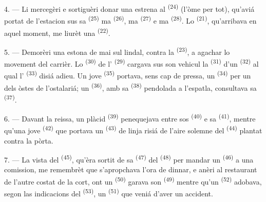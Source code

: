 4. --- Li mercegèri e sortiguèri donar una estrena al 
\textsuperscript{(24)} (l'òme per tot), qu'aviá portat de l'estacion sus sa
 \textsuperscript{(25)} ma 
\textsuperscript{(26)}, ma  \textsuperscript{(27)} e ma
 \textsuperscript{(28)}. Lo 
\textsuperscript{(21)}, qu'arribava en aquel moment, me liurèt una 
\textsuperscript{(22)}.

5. --- Demorèri una estona de mai sul lindal, contra la  \textsuperscript{(23)}, a agachar lo movement del carrièr. Lo
 \textsuperscript{(30)} de l'
\textsuperscript{(29)} cargava sus son vehicul la 
\textsuperscript{(31)} d'un  \textsuperscript{(32)} al qual
l' \textsuperscript{(33)} disiá adieu. Un jove
 \textsuperscript{(35)} portava, sens cap de pressa, un
 \textsuperscript{(34)} per un dels òstes de l'ostalariá; un
 \textsuperscript{(36)}, amb sa 
\textsuperscript{(38)} pendolada a l'espatla, consultava sa 
\textsuperscript{(37)}.

\VUsaut{4.0mm}
\VUsaut{3.0mm}

6. --- Davant la reissa, un plàcid  \textsuperscript{(39)}
penequejava entre sos  \textsuperscript{(40)} e sa
 \textsuperscript{(41)}, mentre qu'una jove
 \textsuperscript{(42)} que portava un 
\textsuperscript{(43)} de linja risiá de l'aire solemne del  \textsuperscript{(44)} plantat contra la pòrta.

7. --- La vista del  \textsuperscript{(45)}, qu'èra sortit de sa
 \textsuperscript{(47)} del 
\textsuperscript{(48)} per mandar un  \textsuperscript{(46)} a
una comission, me remembrèt que s'apropchava l'ora de dinnar, e anèri al restaurant
de l'autre costat de la cort, ont un 
\textsuperscript{(50)} garava son  \textsuperscript{(49)}
mentre qu'un  \textsuperscript{(52)} adobava, segon las
indicacions del  \textsuperscript{(53)}, un  \textsuperscript{(51)} que veniá d'aver un accident.

